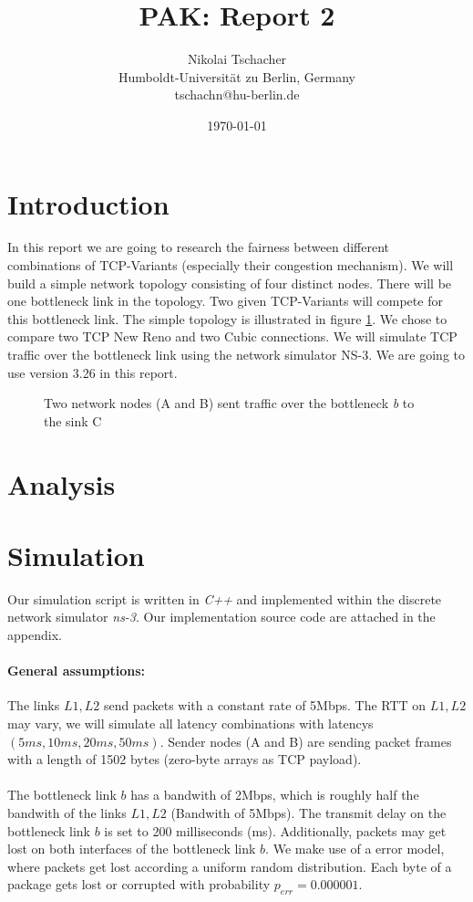 \documentclass{article}
\title{PAK: Report 2}
\author{Nikolai Tschacher  \\
	Humboldt-Universität zu Berlin, Germany  \\
	tschachn@hu-berlin.de}
\date{\today}
\begin{document}
\maketitle



\section{Introduction} 
In this report we are going to research the fairness between different combinations of TCP-Variants (especially their congestion mechanism). We will build a simple network topology consisting of four distinct nodes. There will be one bottleneck link in the topology. Two given TCP-Variants will compete for this bottleneck link. The simple topology is illustrated in figure \ref{fig:simpleYtopology}. We chose to compare two TCP New Reno and two Cubic connections. We will simulate TCP traffic over the bottleneck link using the network simulator NS-3. We are going to use version 3.26 in this report.

\begin{figure}[H]
\centering
\let\clearpage\relax

\caption{Two network nodes (A and B) sent traffic over the bottleneck \textit{b} to the sink C} \label{fig:simpleYtopology}
\end{figure}

\section{Analysis} \label{analysis}
\let\clearpage\relax


\section{Simulation} \label{simulation}
Our simulation script is written in \emph{C++} and implemented within the discrete network simulator \emph{ns-3}. Our implementation source code are attached in the appendix.

\paragraph{General assumptions:} The links $L1, L2$ send packets with a constant rate of 5Mbps. The RTT on $L1, L2$ may vary, we will simulate all latency combinations with latencys $(5ms, 10ms, 20ms, 50ms)$. Sender nodes (A and B) are sending packet frames  with a length of 1502 bytes (zero-byte arrays as TCP payload).\\\\
The bottleneck link $b$ has a bandwith of 2Mbps, which is roughly half the bandwith of the links $L1, L2$ (Bandwith of 5Mbps). The transmit delay on the bottleneck link $b$ is set to 200 milliseconds (ms). Additionally, packets may get lost on both interfaces of the bottleneck link $b$. We make use of a error model, where packets get lost according a uniform random distribution. Each byte of a package gets lost or corrupted with probability $p_{err} = 0.000001$. 
\end{document}
